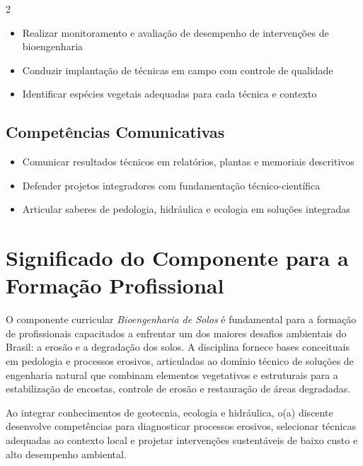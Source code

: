 \documentclass[11pt,a4paper]{article}
\begin{document}
\begin{multicols}{2}
\begin{itemize}
\item Realizar monitoramento e avaliação de desempenho de intervenções de bioengenharia

\item Conduzir implantação de técnicas em campo com controle de qualidade

\item Identificar espécies vegetais adequadas para cada técnica e contexto

\end{itemize}

\subsection*{Competências Comunicativas}

\begin{itemize}

\item Comunicar resultados técnicos em relatórios, plantas e memoriais descritivos

\item Defender projetos integradores com fundamentação técnico-científica

\item Articular saberes de pedologia, hidráulica e ecologia em soluções integradas

\end{itemize}

\end{multicols}

\section*{Significado do Componente para a Formação Profissional}

O componente curricular \textit{Bioengenharia de Solos} é fundamental para a formação de profissionais capacitados a enfrentar um dos maiores desafios ambientais do Brasil: a erosão e a degradação dos solos. A disciplina fornece bases conceituais em pedologia e processos erosivos, articuladas ao domínio técnico de soluções de engenharia natural que combinam elementos vegetativos e estruturais para a estabilização de encostas, controle de erosão e restauração de áreas degradadas.

Ao integrar conhecimentos de geotecnia, ecologia e hidráulica, o(a) discente desenvolve competências para diagnosticar processos erosivos, selecionar técnicas adequadas ao contexto local e projetar intervenções sustentáveis de baixo custo e alto desempenho ambiental.
\end{document}
